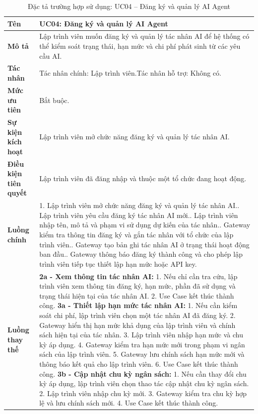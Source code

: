 \begin{longtable}{|L{4.2cm}|L{9.5cm}|}
\caption[Đặc tả UC04]{Đặc tả trường hợp sử dụng: UC04 -- Đăng ký và quản lý AI Agent} \\\hline
\textbf{Tên} & UC04: Đăng ký và quản lý AI Agent \\\hline
\textbf{Mô tả} & Lập trình viên muốn đăng ký và quản lý tác nhân AI để hệ thống có thể kiểm soát trạng thái, hạn mức và chi phí phát sinh từ các yêu cầu AI.\\\hline
\textbf{Tác nhân} & Tác nhân chính: Lập trình viên.\newline Tác nhân hỗ trợ: Không có.\\\hline
\textbf{Mức ưu tiên} & Bắt buộc.\\\hline
\textbf{Sự kiện kích hoạt} & Lập trình viên mở chức năng đăng ký và quản lý tác nhân AI.\\\hline
\textbf{Điều kiện tiên quyết} & Lập trình viên đã đăng nhập và thuộc một tổ chức đang hoạt động.\\\hline
\textbf{Luồng chính} &
1. Lập trình viên mở chức năng đăng ký và quản lý tác nhân AI.. Lập trình viên yêu cầu đăng ký tác nhân AI mới.. Lập trình viên nhập tên, mô tả và phạm vi sử dụng dự kiến của tác nhân.. Gateway kiểm tra thông tin đăng ký và gắn tác nhân với tổ chức của lập trình viên.. Gateway tạo bản ghi tác nhân AI ở trạng thái hoạt động ban đầu.. Gateway thông báo đăng ký thành công và cho phép lập trình viên tiếp tục thiết lập hạn mức hoặc API key.\\\hline
\textbf{Luồng thay thế} &
\textbf{2a - Xem thông tin tác nhân AI:} 1. Nếu chỉ cần tra cứu, lập trình viên xem thông tin đăng ký, hạn mức, phần đã sử dụng và trạng thái hiện tại của tác nhân AI. 2. Use Case kết thúc thành công.\newline
\textbf{3a - Thiết lập hạn mức tác nhân AI:} 1. Nếu cần kiểm soát chi phí, lập trình viên chọn một tác nhân AI đã đăng ký. 2. Gateway hiển thị hạn mức khả dụng của lập trình viên và chính sách hiện tại của tác nhân. 3. Lập trình viên nhập hạn mức và chu kỳ áp dụng. 4. Gateway kiểm tra hạn mức mới trong phạm vi ngân sách của lập trình viên. 5. Gateway lưu chính sách hạn mức mới và thông báo kết quả cho lập trình viên. 6. Use Case kết thúc thành công.\newline
\textbf{3b - Cập nhật chu kỳ ngân sách:} 1. Nếu cần thay đổi chu kỳ áp dụng, lập trình viên chọn thao tác cập nhật chu kỳ ngân sách. 2. Lập trình viên nhập chu kỳ mới. 3. Gateway kiểm tra chu kỳ hợp lệ và lưu chính sách mới. 4. Use Case kết thúc thành công.\newline

\end{longtable}
